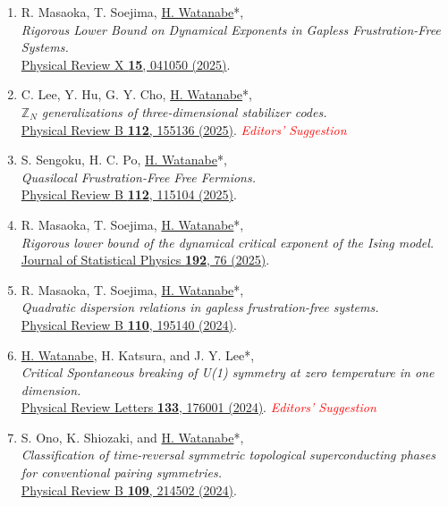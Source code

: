 \documentclass[letterpaper,11pt]{article}
\begin{document}
\begin{enumerate}
\item R. Masaoka, T. Soejima, \underline{H. Watanabe}*, \\\emph{Rigorous Lower Bound on Dynamical Exponents in Gapless Frustration-Free Systems.}\\{\href{https://doi.org/10.1103/d4c4-5p2r}{Physical Review X {\bf 15}, 041050 (2025)}.}

\item C. Lee, Y. Hu, G. Y. Cho, \underline{H. Watanabe}*, \\\emph{$\mathbb{Z}_N$ generalizations of three-dimensional stabilizer codes.}\\{\href{https://doi.org/10.1103/qctl-hwvh}{Physical Review B {\bf 112}, 155136 (2025)}. \emph{\small \textcolor{red}{Editors' Suggestion}}}

\item S. Sengoku, H. C. Po, \underline{H. Watanabe}*, \\\emph{Quasilocal Frustration-Free Free Fermions.}\\{\href{https://doi.org/10.1103/794x-jdn7}{Physical Review B {\bf 112}, 115104 (2025)}.}

\item R. Masaoka, T. Soejima, \underline{H. Watanabe}*, \\\emph{Rigorous lower bound of the dynamical critical exponent of the Ising model.}\\{\href{https://doi.org/10.1007/s10955-025-03456-3}{Journal of Statistical Physics {\bf 192}, 76 (2025)}.}

\item R. Masaoka, T. Soejima, \underline{H. Watanabe}*, \\\emph{Quadratic dispersion relations in gapless frustration-free systems.}\\{\href{https://doi.org/10.1103/PhysRevB.110.195140}{Physical Review B {\bf 110}, 195140 (2024)}.}

\item \underline{H. Watanabe}, H. Katsura, and J. Y. Lee*, \\\emph{Critical Spontaneous breaking of U(1) symmetry at zero temperature in one dimension.}\\{\href{https://doi.org/10.1103/PhysRevLett.133.176001}{Physical Review Letters {\bf 133}, 176001 (2024)}. \emph{\small \textcolor{red}{Editors' Suggestion}}}

\item S. Ono, K. Shiozaki, and \underline{H. Watanabe}*, \\\emph{Classification of time-reversal symmetric topological superconducting phases for conventional pairing symmetries.}\\{\href{https://doi.org/10.1103/PhysRevB.109.214502}{Physical Review B {\bf 109}, 214502 (2024)}.}


\end{enumerate}
\end{document}
